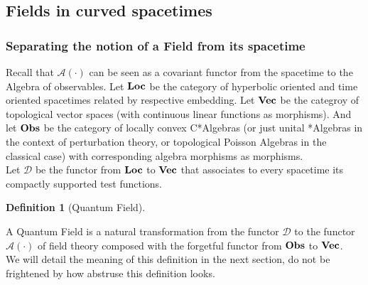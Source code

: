 \documentclass[a4paper,11pt]{article}
\numberwithin{equation}{section}
\theoremstyle{definition}
\newtheorem{definition}{Definition}
\newtheorem{comment}{Comment}
\begin{document}

    
\subsection{Fields in curved spacetimes}

\subsubsection{Separating the notion of a Field from its spacetime}
        Recall that $\mathcal{A}(\cdot)$ can be seen as a covariant functor from the spacetime to the Algebra of observables. Let $\bold{Loc}$ be the category of hyperbolic oriented and time oriented spacetimes related by respective embedding. Let $\bold{Vec}$ be the categroy of topological vector spaces (with continuous linear functions as morphisms). And let $\bold{Obs}$ be the category of locally convex C*Algebras (or just unital *Algebras in the context of perturbation theory, or topological Poisson Algebras in the classical case) with corresponding algebra morphisms as morphisms.\\
Let $\mathcal{D}$ be the functor from $\bold{Loc}$ to $\bold{Vec}$ that associates to every spacetime its compactly supported test functions.

\begin{definition}[Quantum Field]\label{QField}$\quad$

    A Quantum Field is a natural transformation from the functor $\mathcal{D}$ to the functor $\mathcal{A}(\cdot)$ of field theory composed with the forgetful functor from $\bold{Obs}$ to $\bold{Vec}$.\\
    We will detail the meaning of this definition in the next section, do not be frightened by how abstruse this definition looks.
\end{definition}
\end{document}
